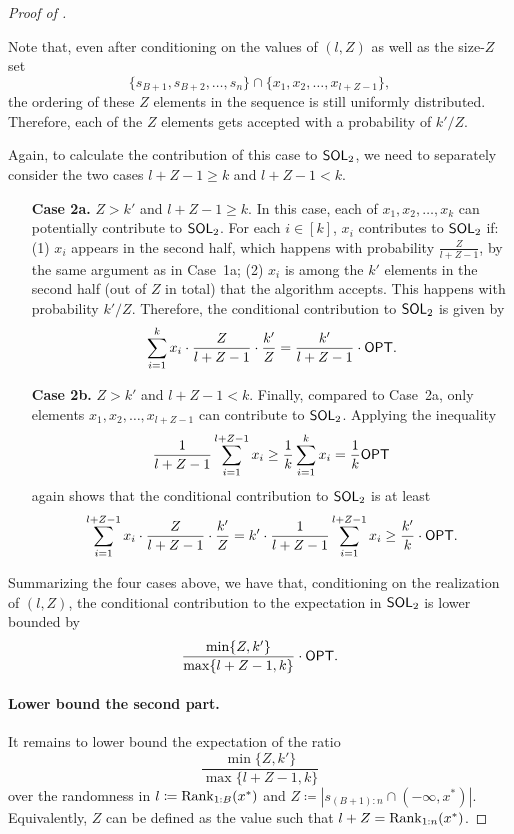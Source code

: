 \begin{proof}[Proof of ]
\begin{enumerate}
    Note that, even after conditioning on the values of $(l, Z)$ as well as the size-$Z$ set
    \[
        \{s_{B+1}, s_{B+2}, \ldots, s_n\} \cap \{x_1, x_2, \ldots, x_{l+Z-1}\},
    \]
    the ordering of these $Z$ elements in the sequence is still uniformly distributed. Therefore, each of the $Z$ elements gets accepted with a probability of $k' / Z$.
    
    Again, to calculate the contribution of this case to $\mathsf{SOL}_2$, we need to separately consider the two cases $l + Z - 1 \ge k$ and $l + Z - 1 < k$.
    \begin{enumerate}
        \item[\textbf{Case 2a.}] $Z > k'$ and $l + Z - 1 \ge k$. In this case, each of $x_1, x_2, \ldots, x_k$ can potentially contribute to $\mathsf{SOL}_2$. For each $i \in [k]$, $x_i$ contributes to $\mathsf{SOL}_2$ if: (1) $x_i$ appears in the second half, which happens with probability $\frac{Z}{l + Z - 1}$, by the same argument as in Case~1a; (2) $x_i$ is among the $k'$ elements in the second half (out of $Z$ in total) that the algorithm accepts. This happens with probability $k'/Z$. Therefore, the conditional contribution to $\mathsf{SOL}_2$ is given by
        \[
            \sum_{i=1}^{k}x_i\cdot\frac{Z}{l + Z - 1}\cdot\frac{k'}{Z}
        =   \frac{k'}{l+Z-1}\cdot\mathsf{OPT}.
        \]
        
        \item[\textbf{Case 2b.}] $Z > k'$ and $l + Z - 1 < k$. Finally, compared to Case~2a, only elements $x_1, x_2, \ldots, x_{l+Z-1}$ can contribute to $\mathsf{SOL}_2$. Applying the inequality
        \[
            \frac{1}{l + Z - 1}\sum_{i=1}^{l+Z-1}x_i
        \ge \frac{1}{k}\sum_{i=1}^{k}x_i
        =   \frac{1}{k}\mathsf{OPT}
        \]
        again shows that the conditional contribution to $\mathsf{SOL}_2$ is at least
        \[
             \sum_{i=1}^{l+Z-1}x_i\cdot\frac{Z}{l + Z - 1}\cdot\frac{k'}{Z}
        =   k'\cdot\frac{1}{l+Z-1}\sum_{i=1}^{l+Z-1}x_i
        \ge \frac{k'}{k}\cdot\mathsf{OPT}.
        \]
    \end{enumerate}  
\end{enumerate}
Summarizing the four cases above, we have that, conditioning on the realization of $(l, Z)$, the conditional contribution to the expectation in $\mathsf{SOL}_2$ is lower bounded by
\[
    \frac{\min\{Z, k'\}}{\max\{l+Z-1, k\}}\cdot \mathsf{OPT}.
\]

\paragraph{Lower bound the second part.} It remains to lower bound the expectation of the ratio
\begin{equation}\label{eq:ratio-of-interest}
    \frac{\min\{Z, k'\}}{\max\{l+Z-1, k\}}
\end{equation}
over the randomness in $l \coloneqq \mathrm{Rank}_{1:B}(x^*)$ and $Z \coloneqq |s_{(B+1):n} \cap (-\infty, x^*)|$. Equivalently, $Z$ can be defined as the value such that $l + Z = \mathrm{Rank}_{1:n}(x^*)$.


\end{proof}
